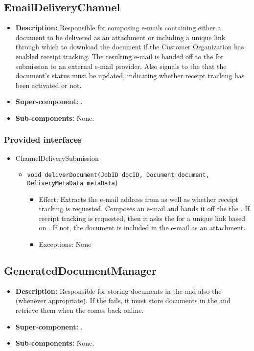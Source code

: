 \subsection{EmailDeliveryChannel}
\begin{itemize}
    \item \textbf{Description:} Responsible for composing e-mails containing either a document to be delivered as an attachment or including a unique link through which to download the document if the Customer Organization has enabled receipt tracking. The resulting e-mail is handed off to the  for submission to an external e-mail provider. Also signals to the  that the document's status must be updated, indicating whether receipt tracking has been activated or not.
    \item \textbf{Super-component:} .
    \item \textbf{Sub-components:} None.
\end{itemize}

\subsubsection*{Provided interfaces}
\begin{itemize}
    \item ChannelDeliverySubmission
    \begin{itemize}
        \item \texttt{void deliverDocument(JobID docID, Document document, DeliveryMetaData metaData)}
        \begin{itemize}
            \item Effect: Extracts the e-mail address from  as well as whether receipt tracking is requested. Composes an e-mail and hands it off the the . If receipt tracking is requested, then it asks the  for a unique link based on . If not, the document is included in the e-mail as an attachment.
            \item Exceptions: None
        \end{itemize}
    \end{itemize}
\end{itemize}

\subsection{GeneratedDocumentManager}
\begin{itemize}
    \item \textbf{Description:} Responsible for storing documents in the  and also the  (whenever appropriate). If the  fails, it must store documents in the  and retrieve them when the  comes back online.
    \item \textbf{Super-component:} .
    \item \textbf{Sub-components:} None.
\end{itemize}

